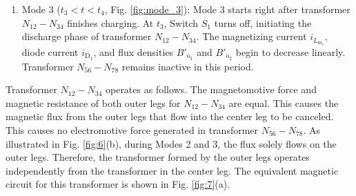 \documentclass[lettersize,journal]{IEEEtran}
\begin{document}
\begin{enumerate}
    \item Mode 3 ($t_3 < t < t_4$, Fig. \ref{fig:mode_3}): Mode 3 starts right after transformer $N_{12}-N_{34}$ finishes charging. At $t_3$, Switch $S_1$ turns off, initiating the discharge phase of transformer $N_{12}-N_{34}$. The magnetizing current $i_{L_{\mathrm{m}_1}}$, diode current $i_{\mathrm{D}_1}$, and flux densities $B'_{\mathrm{o}_1}$ and $B'_{\mathrm{o}_2}$ begin to decrease linearly. Transformer $N_{56}-N_{78}$ remains inactive in this period.
\end{enumerate}
\vspace{\baselineskip}
{\color{red} Transformer $N_{12}-N_{34}$ operates as follows. The magnetomotive force and magnetic resistance of both outer legs for $N_{12}-N_{34}$ are equal. This causes the magnetic flux from the outer legs that flow into the center leg to be canceled. This causes no electromotive force generated in transformer $N_{56}-N_{78}$. As illustrated in Fig. \ref{fig:6}(b), during Modes 2 and 3, the flux solely flows on the outer legs. Therefore, the transformer formed by the outer legs operates independently from the transformer in the center leg. The equivalent magnetic circuit for this transformer is shown in Fig. \ref{fig:7}(a).}
\vspace{\baselineskip}
\end{document}
